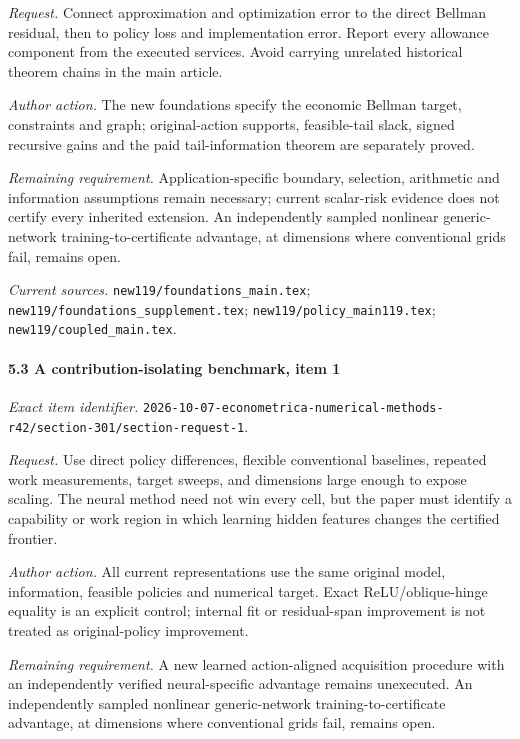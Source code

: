 \par\emph{Request.} Connect approximation and optimization error to the direct Bellman residual, then to policy loss and implementation error. Report every allowance component from the executed services. Avoid carrying unrelated historical theorem chains in the main article.

\par\emph{Author action.} The new foundations specify the economic Bellman target, constraints and graph; original-action supports, feasible-tail slack, signed recursive gains and the paid tail-information theorem are separately proved.

\par\emph{Remaining requirement.} Application-specific boundary, selection, arithmetic and information assumptions remain necessary; current scalar-risk evidence does not certify every inherited extension. An independently sampled nonlinear generic-network training-to-certificate advantage, at dimensions where conventional grids fail, remains open.

\par\emph{Current sources.} \nolinkurl{new119/foundations_main.tex}; \nolinkurl{new119/foundations_supplement.tex}; \nolinkurl{new119/policy_main119.tex}; \nolinkurl{new119/coupled_main.tex}.

\paragraph{5.3 A contribution-isolating benchmark, item 1}

\emph{Exact item identifier.} \nolinkurl{2026-10-07-econometrica-numerical-methods-r42/section-301/section-request-1}.

\par\emph{Request.} Use direct policy differences, flexible conventional baselines, repeated work measurements, target sweeps, and dimensions large enough to expose scaling. The neural method need not win every cell, but the paper must identify a capability or work region in which learning hidden features changes the certified frontier.

\par\emph{Author action.} All current representations use the same original model, information, feasible policies and numerical target. Exact ReLU/\allowbreak{}oblique-hinge equality is an explicit control; internal fit or residual-span improvement is not treated as original-policy improvement.

\par\emph{Remaining requirement.} A new learned action-aligned acquisition procedure with an independently verified neural-specific advantage remains unexecuted. An independently sampled nonlinear generic-network training-to-certificate advantage, at dimensions where conventional grids fail, remains open.

